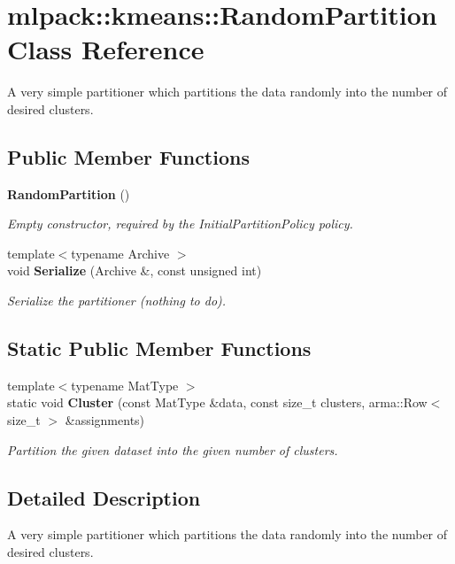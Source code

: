 \section{mlpack\+:\+:kmeans\+:\+:Random\+Partition Class Reference}
\label{classmlpack_1_1kmeans_1_1RandomPartition}


A very simple partitioner which partitions the data randomly into the number of desired clusters.  


\subsection*{Public Member Functions}
\begin{DoxyCompactItemize}
\item 
{\bf Random\+Partition} ()
\begin{DoxyCompactList}\small\item\em Empty constructor, required by the Initial\+Partition\+Policy policy. \end{DoxyCompactList}\item 
{\footnotesize template$<$typename Archive $>$ }\\void {\bf Serialize} (Archive \&, const unsigned int)
\begin{DoxyCompactList}\small\item\em Serialize the partitioner (nothing to do). \end{DoxyCompactList}\end{DoxyCompactItemize}
\subsection*{Static Public Member Functions}
\begin{DoxyCompactItemize}
\item 
{\footnotesize template$<$typename Mat\+Type $>$ }\\static void {\bf Cluster} (const Mat\+Type \&data, const size\+\_\+t clusters, arma\+::\+Row$<$ size\+\_\+t $>$ \&assignments)
\begin{DoxyCompactList}\small\item\em Partition the given dataset into the given number of clusters. \end{DoxyCompactList}\end{DoxyCompactItemize}


\subsection{Detailed Description}
A very simple partitioner which partitions the data randomly into the number of desired clusters. 

